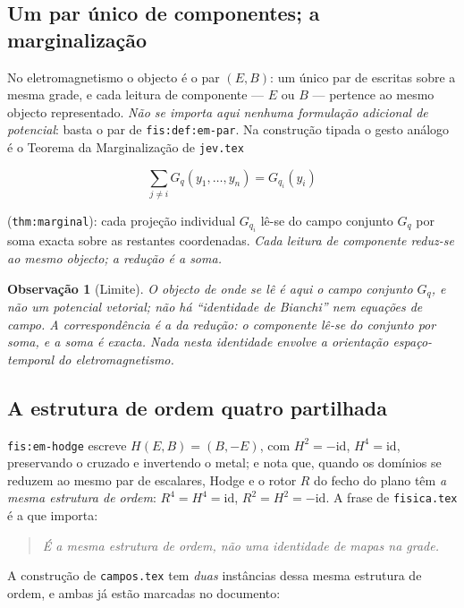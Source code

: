 \documentclass[11pt,a4paper]{article}
\newtheorem{observacao}{Observação}
\begin{document}
\subsection{Um par único de componentes; a marginalização}

No eletromagnetismo o objecto é o par $(E,B)$: um único par de escritas sobre a
mesma grade, e cada leitura de componente --- $E$ ou $B$ --- pertence ao mesmo
objecto representado. \emph{Não se importa aqui nenhuma formulação adicional de
potencial}: basta o par de \texttt{fis:def:em-par}. Na construção tipada o gesto
análogo é o Teorema da Marginalização de \texttt{jev.tex}

\[
\boxed{\;\sum_{j\neq i} G_q(y_1,\dots,y_n)=G_{q_i}(y_i)\;}
\]

(\texttt{thm:marginal}): cada projeção individual $G_{q_i}$ lê-se do campo
conjunto $G_q$ por soma exacta sobre as restantes coordenadas. \emph{Cada leitura
de componente reduz-se ao mesmo objecto; a redução é a soma.}

\begin{observacao}[Limite]
\label{obs:limite-marginal}
O objecto de onde se lê é aqui o campo conjunto $G_q$, e não um potencial
vetorial; não há ``identidade de Bianchi'' nem equações de campo. A
correspondência é a da \emph{redução}: o componente lê-se do conjunto por soma,
e a soma é exacta. Nada nesta identidade envolve a orientação espaço-temporal
do eletromagnetismo.
\end{observacao}

\subsection{A estrutura de ordem quatro partilhada}

\texttt{fis:em-hodge} escreve $H(E,B)=(B,-E)$, com $H^{2}=-\mathrm{id}$,
$H^{4}=\mathrm{id}$, preservando o cruzado e invertendo o metal; e nota que,
quando os domínios se reduzem ao mesmo par de escalares, Hodge e o rotor $R$
do fecho do plano têm \emph{a mesma estrutura de ordem}: $R^{4}=H^{4}=\mathrm{id}$,
$R^{2}=H^{2}=-\mathrm{id}$. A frase de \texttt{fisica.tex} é a que importa:

\begin{quote}
\emph{É a mesma estrutura de ordem, não uma identidade de mapas na grade.}
\end{quote}

A construção de \texttt{campos.tex} tem \emph{duas} instâncias dessa mesma
estrutura de ordem, e ambas já estão marcadas no documento:
\end{document}
